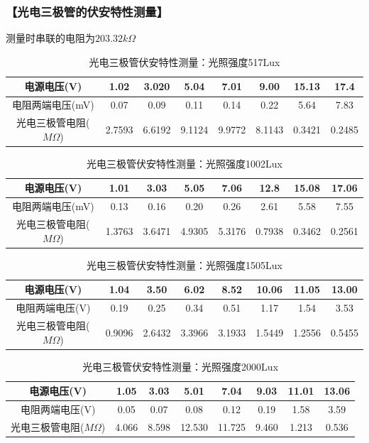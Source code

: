 \documentclass{ctexart}
\let\oldsubsubsection\subsubsection
\renewcommand{\subsubsection}[1]{\oldsubsubsection{\!\!\!\!\!\!【#1】}}
\begin{document}
\newpage
\subsubsection{光电三极管的伏安特性测量}

测量时串联的电阻为$203.32k\Omega$

\begin{table}[H]
  \centering
  \begin{tabular}{|c|c|c|c|c|c|c|c|}
    \hline
    电源电压(V) &1.02&3.020&5.04&7.01&9.00&15.13&17.4\\\hline
    电阻两端电压(mV) &0.07&0.09&0.11&0.14&0.22&5.64&7.83\\\hline
    光电三极管电阻($M\Omega$) &2.7593&6.6192&9.1124&9.9772&8.1143&0.3421&0.2485 \\\hline
  \end{tabular}
  \caption{光电三极管伏安特性测量：光照强度517Lux}
\end{table}

\begin{table}[H]
  \centering
  \begin{tabular}{|c|c|c|c|c|c|c|c|}
    \hline
    电源电压(V) &1.01&3.03&5.05&7.06&12.8&15.08&17.06\\\hline
    电阻两端电压(mV) &0.13&0.16&0.20&0.26&2.61&5.58&7.55\\\hline
    光电三极管电阻($M\Omega$) & 1.3763&3.6471&4.9305&5.3176&0.7938&0.3462&0.2561\\\hline
  \end{tabular}
  \caption{光电三极管伏安特性测量：光照强度1002Lux}
\end{table}

\begin{table}[H]
  \centering
  \begin{tabular}{|c|c|c|c|c|c|c|c|}
    \hline
    电源电压(V) &1.04&3.50&6.02&8.52&10.06&11.05&13.00\\\hline
    电阻两端电压(V) &0.19&0.25&0.34&0.51&1.17&1.54&3.53\\\hline
    光电三极管电阻($M\Omega$) &0.9096&2.6432&3.3966&3.1933&1.5449&1.2556&0.5455 \\\hline
  \end{tabular}
  \caption{光电三极管伏安特性测量：光照强度1505Lux}
\end{table}

\begin{table}[H]
  \centering
  \begin{tabular}{|c|c|c|c|c|c|c|c|}
    \hline
    电源电压(V) &1.05&3.03&5.01&7.04&9.03&11.01&13.06\\\hline
    电阻两端电压(V) &0.05&0.07&0.08&0.12&0.19&1.58&3.59\\\hline
    光电三极管电阻($M\Omega$) & 4.066&8.598&12.530&11.725&9.460&1.213&0.536\\\hline
  \end{tabular}
  \caption{光电三极管伏安特性测量：光照强度2000Lux}
\end{table}
\end{document}

